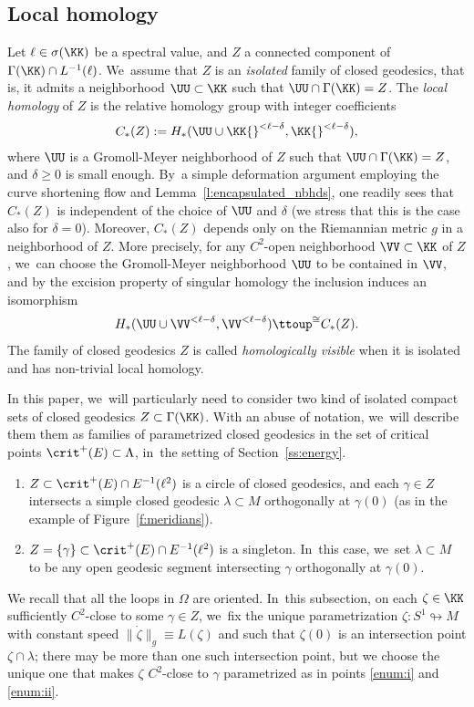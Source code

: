 \subsection{Local homology}\label{ss:hom_visible}
Let $\ell\in\sigma(\KK)$ be a spectral value, and $Z$ a connected component of $\Gamma(\KK)\cap L^{-1}(\ell)$. We~assume that $Z$ is an \emph{isolated} family of closed geodesics, that is, it admits a neighborhood $\UU\subset\KK$ such that $\UU\cap\Gamma(\KK)=Z$.
The \emph{local homology} of $Z$ is the relative homology group with integer coefficients
\begin{align*}
C_*(Z)
:=
H_*(\UU\cup\KK{}^{<\ell-\delta},\KK{}^{<\ell-\delta}),
\end{align*}
where $\UU$ is a Gromoll-Meyer neighborhood of $Z$ such that $\UU\cap\Gamma(\KK)=Z$, and $\delta\geq0$ is small enough. By~a simple deformation argument employing the curve shortening flow and Lemma~\ref{l:encapsulated_nbhds}, one readily sees that $C_*(Z)$ is independent of the choice of $\UU$ and $\delta$ (we stress that this is the case also for $\delta=0$). Moreover, $C_*(Z)$ depends only on the Riemannian metric $g$ in a neighborhood of $Z$. More precisely, for any $C^2$-open neighborhood $\VV\subset\KK$ of $Z$, we~can choose the Gromoll-Meyer neighborhood $\UU$ to be contained in $\VV$, and by the excision property of singular homology the inclusion induces an isomorphism
\begin{align*}
H_*(\UU\cup\VV^{<\ell-\delta},\VV^{<\ell-\delta})
\ttoup^{\cong}
C_*(Z).
\end{align*}
The family of closed geodesics $Z$ is called \emph{homologically visible} when it is isolated and has non-trivial local homology.

In this paper, we~will particularly need to consider two kind of isolated compact sets of closed geodesics $Z\subset\Gamma(\KK)$. With an abuse of notation, we~will describe them them as families of parametrized closed geodesics in the set of critical points $\crit^+(E)\subset\Lambda$, in~the setting of Section~\ref{ss:energy}.

\begin{enumerate}
\item\label{enum:i}
$Z\subset\crit^+(E)\cap E^{-1}(\ell^2)$ is a circle of closed geodesics, and each $\gamma\in Z$ intersects a simple closed geodesic $\lambda\subset M$ orthogonally at $\gamma(0)$ (as in the example of Figure~\ref{f:meridians}).

\item\label{enum:ii}
$Z=\{\gamma\}\subset\crit^+(E)\cap E^{-1}(\ell^2)$ is a singleton. In~this case, we~set $\lambda\subset M$ to be any open geodesic segment intersecting $\gamma$ orthogonally at $\gamma(0)$.
\end{enumerate}
We recall that all the loops in $\Omega$ are oriented. In~this subsection, on each $\zeta\in\KK$ sufficiently $C^2$-close to some $\gamma\in Z$, we~fix the unique parametrization $\zeta:S^1\looparrowright M$ with constant speed $\|\dot\zeta\|_g\equiv L(\zeta)$ and such that $\zeta(0)$ is an intersection point $\zeta\cap\lambda$; there may be more than one such intersection point, but we choose the unique one that makes $\zeta$ $C^2$-close to $\gamma$ parametrized as in points \eqref{enum:i} and \eqref{enum:ii}.

